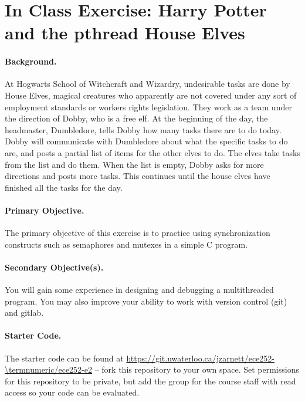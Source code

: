 




\section*{In Class Exercise: Harry Potter and the pthread House Elves}

\paragraph{Background.}
At Hogwarts School of Witchcraft and Wizardry, undesirable tasks are done by House
Elves, magical creatures who apparently are not covered under any sort of employment
standards or workers rights legislation. They work as a team under the direction of
Dobby, who is a free elf. At the beginning of the day, the headmaster, Dumbledore, tells Dobby how many tasks there are to do today. Dobby will communicate with Dumbledore about what the specific tasks to do are, and posts a partial list of items for the other elves to do. The elves take tasks from the list and do them. When the list is empty, Dobby asks for more directions and posts more tasks. This continues until the house elves have finished all the tasks for the day.

\paragraph{Primary Objective.} The primary objective of this exercise is to practice using synchronization constructs such as semaphores and mutexes in a simple C program.

\paragraph{Secondary Objective(s).} You will gain some experience in designing and debugging a multithreaded program. You may also improve your ability to work with version control (git) and gitlab.

\paragraph{Starter Code.} The starter code can be found at \url{https://git.uwaterloo.ca/jzarnett/ece252-\termnumeric/ece252-e2} -- fork this repository to your own space. Set permissions for this repository to be private, but add the group for the course staff with read access so your code can be evaluated.


